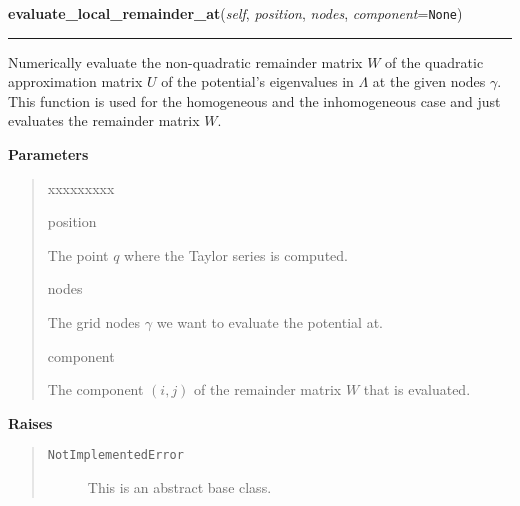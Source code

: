     \vspace{0.5ex}

\hspace{.8\funcindent}\begin{boxedminipage}{\funcwidth}

    \raggedright \textbf{evaluate\_local\_remainder\_at}(\textit{self}, \textit{position}, \textit{nodes}, \textit{component}={\tt None})

    \vspace{-1.5ex}

    \rule{\textwidth}{0.5\fboxrule}
\setlength{\parskip}{2ex}
    Numerically evaluate the non-quadratic remainder matrix $W$ of the
    quadratic approximation matrix $U$ of the potential's eigenvalues in
    $\Lambda$ at the given nodes
    $\gamma$. This function is used for the homogeneous
    and the inhomogeneous case and just evaluates the remainder matrix
    $W$.

\setlength{\parskip}{1ex}
      \textbf{Parameters}
      \vspace{-1ex}

      \begin{quote}
        \begin{Ventry}{xxxxxxxxx}

          \item[position]

          The point $q$ where the Taylor series is computed.

          \item[nodes]

          The grid nodes $\gamma$ we want to evaluate the
          potential at.

          \item[component]

          The component $\left(i,j \right)$ of the remainder
          matrix $W$ that is evaluated.

        \end{Ventry}

      \end{quote}

      \textbf{Raises}
    \vspace{-1ex}

      \begin{quote}
        \begin{description}

          \item[\texttt{NotImplementedError}]

          This is an abstract base class.

        \end{description}

      \end{quote}

    \end{boxedminipage}


